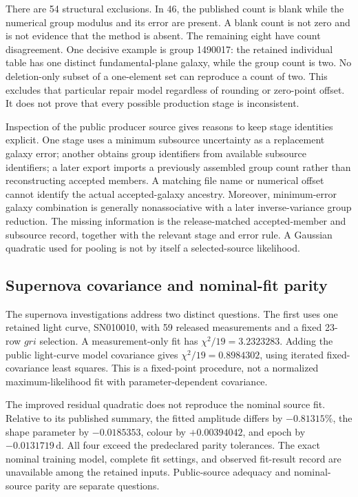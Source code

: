 There are 54 structural exclusions. In 46, the published count is blank while the numerical group modulus and its error are present. A blank count is not zero and is not evidence that the method is absent. The remaining eight have count disagreement. One decisive example is group 1490017: the retained individual table has one distinct fundamental-plane galaxy, while the group count is two. No deletion-only subset of a one-element set can reproduce a count of two. This excludes that particular repair model regardless of rounding or zero-point offset. It does not prove that every possible production stage is inconsistent.

Inspection of the public producer source gives reasons to keep stage identities explicit. One stage uses a minimum subsource uncertainty as a replacement galaxy error; another obtains group identifiers from available subsource identifiers; a later export imports a previously assembled group count rather than reconstructing accepted members. A matching file name or numerical offset cannot identify the actual accepted-galaxy ancestry. Moreover, minimum-error galaxy combination is generally nonassociative with a later inverse-variance group reduction. The missing information is the release-matched accepted-member and subsource record, together with the relevant stage and error rule. A Gaussian quadratic used for pooling is not by itself a selected-source likelihood.

\subsection{Supernova covariance and nominal-fit parity}

The supernova investigations address two distinct questions. The first uses one retained light curve, SN010010, with 59 released measurements and a fixed 23-row $gri$ selection. A measurement-only fit has $\chi^2/19=3.2323283$. Adding the public light-curve model covariance gives $\chi^2/19=0.8984302$, using iterated fixed-covariance least squares. This is a fixed-point procedure, not a normalized maximum-likelihood fit with parameter-dependent covariance.

The improved residual quadratic does not reproduce the nominal source fit. Relative to its published summary, the fitted amplitude differs by $-0.81315\%$, the shape parameter by $-0.0185353$, colour by $+0.00394042$, and epoch by $-0.0131719\,\mathrm d$. All four exceed the predeclared parity tolerances. The exact nominal training model, complete fit settings, and observed fit-result record are unavailable among the retained inputs. Public-source adequacy and nominal-source parity are separate questions.

